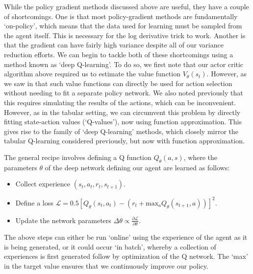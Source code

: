While the policy gradient methods discussed above are useful, they have a couple of shortcomings.
One is that most policy-gradient methods are fundamentally `on-policy', which means that the data used for learning must be sampled from the agent itself.
This is necessary for the log derivative trick to work.
Another is that the gradient can have fairly high variance despite all of our variance reduction efforts.
We can begin to tackle both of these shortcomings using a method known as `deep Q-learning'.
To do so, we first note that our actor critic algorithm above required us to estimate the value function $V_\theta(s_t)$.
However, as we saw in  that such value functions can directly be used for action selection without needing to fit a separate policy network.
We also noted previously that this requires simulating the results of the actions, which can be inconvenient.
However, as in the tabular setting, we can circumvent this problem by directly fitting state-action values (`Q-values'), now using function approximation.
This gives rise to the family of `deep Q-learning' methods, which closely mirror the tabular Q-learning considered previously, but now with function approximation.

The general recipe involves defining a Q function $Q_\theta(a, s)$, where the parameters $\theta$ of the deep network defining our agent are learned as follows:
\begin{itemize}
    \item Collect experience $(s_t, a_t, r_t, s_{t+1})$.
    \item Define a loss $\mathcal{L} = 0.5 [ Q_\theta(s_t, a_t) - (r_t + \text{max}_a Q_\theta(s_{t+1}, a)) ]^2 $.
    \item Update the network parameters $\Delta \theta \propto \frac{\partial \mathcal{L}}{\partial \theta}$.
\end{itemize}
The above steps can either be run `online' using the experience of the agent as it is being generated, or it could occur `in batch', whereby a collection of experiences is first generated follow by optimization of the Q network.
The `max' in the target value ensures that we continuously improve our policy.

